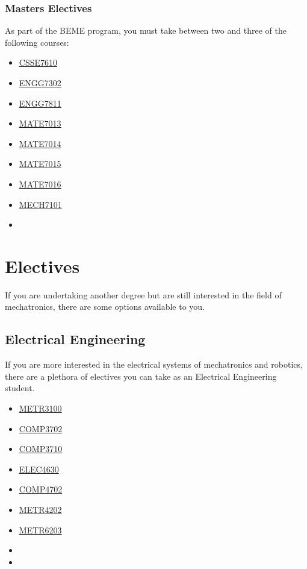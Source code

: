 \documentclass[a4paper,12pt]{report}
\begin{document}
\hypertarget{MASTERS}{\subsection{Masters Electives}}
As part of the BEME program, you must take between two and three of the following courses:
\begin{multicols}{3}
    \begin{itemize}
        \item \hyperlink{CSSE7610}{CSSE7610}
        \item \hyperlink{ENGG7302}{ENGG7302}
        \item \hyperlink{ENGG7811}{ENGG7811}
        \item \hyperlink{MATE7013}{MATE7013}
        \item \hyperlink{MATE7014}{MATE7014}
        \item \hyperlink{MATE7015}{MATE7015}
        \item \hyperlink{MATE7016}{MATE7016}
        \item \hyperlink{MECH7101}{MECH7101}
        \item[]
    \end{itemize}
\end{multicols}


\chapter{Electives}
If you are undertaking another degree but are still interested in the field of mechatronics, there are some options available to you.

\section{Electrical Engineering}
If you are more interested in the electrical systems of mechatronics and robotics, there are a plethora of electives you can take as an Electrical Engineering student.
\begin{multicols}{3}
    \begin{itemize}
        \item \hyperlink{METR3100}{METR3100}
        \item \hyperlink{COMP3702}{COMP3702}
        \item \hyperlink{COMP3710}{COMP3710}
        \item \hyperlink{ELEC4630}{ELEC4630}
        \item \hyperlink{COMP4702}{COMP4702}
        \item \hyperlink{METR4202}{METR4202}
        \item \hyperlink{METR6203}{METR6203}
        \item[]
        \item[]
    \end{itemize}
\end{multicols}
\end{document}
